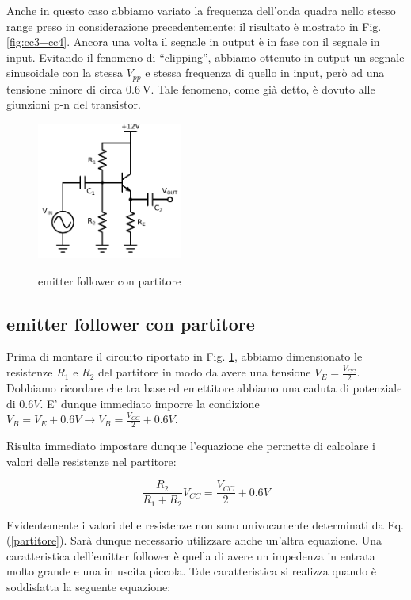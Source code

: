 Anche in questo caso abbiamo variato la frequenza dell'onda quadra nello stesso range preso in considerazione precedentemente: il risultato è mostrato in Fig. \ref{fig:cc3+cc4}.
Ancora una volta il segnale in output è in fase con il segnale in input.
Evitando il fenomeno di ``clipping'', abbiamo ottenuto in output un segnale sinusoidale con la stessa $V_{pp}$ e stessa frequenza di quello in input, però ad una tensione minore di circa $\SI{0.6}{\volt}$. Tale fenomeno, come già detto, è dovuto alle giunzioni p-n del transistor.

\begin{figure}
	\caption{emitter follower con partitore}
	\includegraphics[height=45mm]{cc5.pdf}
	\label{fig:cc5}
\end{figure}

\subsection{emitter follower con partitore}


Prima di montare il circuito riportato in Fig. \ref{fig:cc5}, abbiamo dimensionato le resistenze $R_1$ e $R_2$ del partitore in modo da avere una tensione $V_E=\frac{V_{CC}}{2}$. Dobbiamo ricordare che tra base ed emettitore abbiamo una caduta di potenziale di $0.6V$. E' dunque immediato imporre la condizione $V_B=V_E + 0.6V \rightarrow V_B=\frac{V_{CC}}{2} + 0.6V $.

Risulta immediato impostare dunque l'equazione che permette di calcolare i valori delle resistenze nel partitore:

\begin{equation}
\frac{R_2}{R_1+R_2} V_{CC}=\frac{V_{CC}}{2} + 0.6V
\label{partitore}
\end{equation}

Evidentemente i valori delle resistenze non sono univocamente determinati da Eq.(\ref{partitore}). Sarà dunque necessario utilizzare anche un'altra equazione. Una caratteristica dell'emitter follower è quella di avere un impedenza in entrata molto grande e una in uscita piccola. Tale caratteristica si realizza quando è soddisfatta la seguente equazione:

